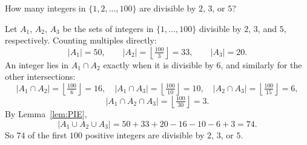 \documentclass[docmute]{article}
\begin{document}
\begin{example}
How many integers in \(\{1, 2, \dots, 100\}\) are divisible by \(2\), \(3\), or \(5\)?

Let \(A_1\), \(A_2\), \(A_3\) be the sets of integers in \(\{1,\dots,100\}\) divisible by \(2\), \(3\), and \(5\), respectively. Counting multiples directly:
\[
|A_1| = 50, \qquad |A_2| = \left\lfloor \tfrac{100}{3} \right\rfloor = 33, \qquad |A_3| = 20.
\]
An integer lies in \(A_1 \cap A_2\) exactly when it is divisible by \(6\), and similarly for the other intersections:
\[
|A_1 \cap A_2| = \left\lfloor \tfrac{100}{6} \right\rfloor = 16, \quad
|A_1 \cap A_3| = \left\lfloor \tfrac{100}{10} \right\rfloor = 10, \quad
|A_2 \cap A_3| = \left\lfloor \tfrac{100}{15} \right\rfloor = 6,
\]
\[
|A_1 \cap A_2 \cap A_3| = \left\lfloor \tfrac{100}{30} \right\rfloor = 3.
\]
By Lemma~\ref{lem:PIE},
\[
|A_1 \cup A_2 \cup A_3|
= 50 + 33 + 20 - 16 - 10 - 6 + 3
= 74.
\]
So \(74\) of the first \(100\) positive integers are divisible by \(2\), \(3\), or \(5\).
\end{example}
\end{document}
